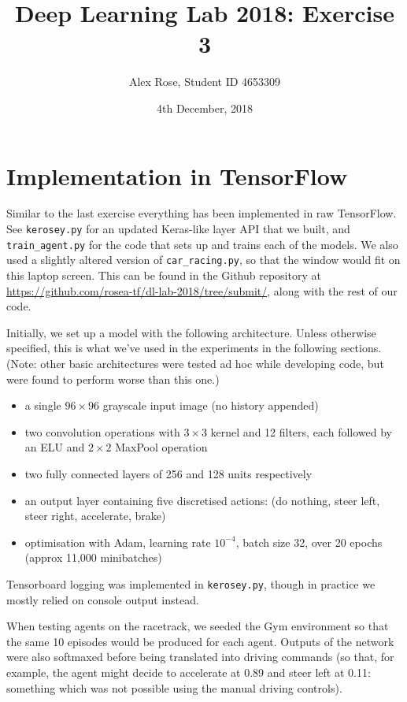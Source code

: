 \documentclass[11pt]{article} %
\title{Deep Learning Lab 2018: Exercise 3}
\author{Alex Rose, Student ID 4653309}
\date{4th December, 2018} %
\begin{document}
\maketitle

\section{Implementation in TensorFlow}

Similar to the last exercise everything has been implemented in raw TensorFlow. See \texttt{kerosey.py} for an updated Keras-like layer API that we built, and \texttt{train\_agent.py} for the code that sets up and trains each of the models. We also used a slightly altered version of \texttt{car\_racing.py}, so that the window would fit on this laptop screen. This can be found in the Github repository at \url{https://github.com/rosea-tf/dl-lab-2018/tree/submit/}, along with the rest of our code.

Initially, we set up a model with the following architecture. Unless otherwise specified, this is what we've used in the experiments in the following sections. (Note: other basic architectures were tested ad hoc while developing code, but were found to perform worse than this one.) 

\begin{itemize}
	\item a single $96 \times 96$ grayscale input image (no history appended)
	\item two convolution operations with $3 \times 3$ kernel and 12 filters, each followed by an ELU and $2 \times 2$ MaxPool operation
	\item two fully connected layers of 256 and 128 units respectively
	\item an output layer containing five discretised actions: (do nothing, steer left, steer right, accelerate, brake)
	\item optimisation with Adam, learning rate $10^{-4}$, batch size 32, over 20 epochs (approx 11,000 minibatches)
	
\end{itemize}

Tensorboard logging was implemented in \texttt{kerosey.py}, though in practice we mostly relied on console output instead.

When testing agents on the racetrack, we seeded the Gym environment so that the same 10 episodes would be produced for each agent. Outputs of the network were also softmaxed before being translated into driving commands (so that, for example, the agent might decide to accelerate at 0.89 and steer left at 0.11: something which was not possible using the manual driving controls).
\end{document}
